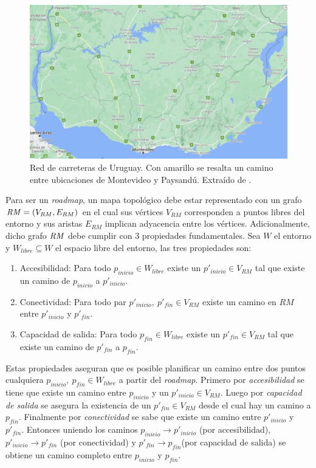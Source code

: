 \begin{figure}[H]
  \center
  \includegraphics[width=0.9\linewidth]{imagenes/uruguayvialMarcado.png}
  \caption[Red de carreteras de Uruguay.]{Red de carreteras de Uruguay. Con amarillo se resalta un camino entre ubicaciones de Montevideo y Paysandú. Extraído de \cite{googlemaps}.}\label{fig:ejemplovial}
\end{figure} 

Para ser un \emph{roadmap}, un mapa topológico debe estar representado con un
grafo $\mathit{RM}=(V_{RM},E_{RM})$ en el cual sus vértices $V_{RM}$ corresponden
a puntos libres del entorno y sus aristas $E_{RM}$ implican adyacencia entre
los vértices. Adicionalmente, dicho grafo $\mathit{RM}$ debe cumplir con 3
propiedades fundamentales. Sea $W$ el entorno y $W_{libre} \subseteq W$ el
espacio libre del entorno, las tres propiedades son:

\begin{enumerate}
  \item Accesibilidad: Para todo $p_{inicio} \in W_{libre}$ existe un $p'_{inicio}\in V_{RM}$ tal que existe un camino de $p_{inicio}$ a $p'_{inicio}$. %
  \item Conectividad: Para todo par $p'_{inicio},\ p'_{fin} \in V_{RM}$ existe un camino en $RM$ entre  $p'_{inicio}$ y $p'_{fin}$.
  \item Capacidad de salida: Para todo $p_{fin} \in W_{libre}$ existe un $p'_{fin} \in V_{RM}$ tal que existe un camino de $p'_{fin}$ a $p_{fin}$.
\end{enumerate}

Estas propiedades aseguran que es posible planificar un camino entre dos puntos cualquiera $p_{inicio},\ p_{fin}\in W_{libre}$ a partir del \emph{roadmap}. Primero por \emph{accesibilidad} se tiene que existe un camino entre $p_{inicio}$ y un $p'_{inicio}\in V_{RM}$. Luego por \emph{capacidad de salida} se asegura la existencia de un  $p'_{fin}\in V_{RM}$ desde el cual hay un camino a $p_{fin}$. Finalmente por \emph{conectividad} se sabe que existe un camino entre $p'_{inicio}$ y $p'_{fin}$. Entonces uniendo los caminos $p_{inicio} \rightarrow p'_{inicio}$ (por accesibilidad), $p'_{inicio} \rightarrow p'_{fin}$ (por conectividad) y $p'_{fin} \rightarrow p_{fin}$(por capacidad de salida) se obtiene un camino completo entre $p_{inicio}$ y $p_{fin}$.

